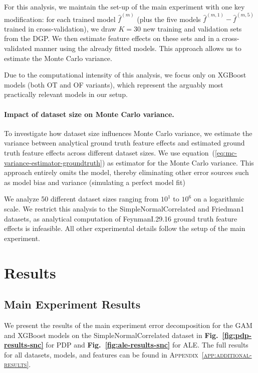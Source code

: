 \documentclass[runningheads]{llncs}
\begin{document}
For this analysis, we maintain the set-up of the main experiment with one key
modification: for each trained model $\hat f^{(m)}$ (plus the five
models $\hat f^{(m,1)} - \hat f^{(m,5)}$ trained in cross-validation), we draw $K=30$ new training
and validation sets from the DGP. We then estimate feature effects on these  %
sets and in a cross-validated manner using the already fitted models. This approach
allows us to estimate the Monte Carlo variance.

Due to the computational intensity of this analysis, we focus only on XGBoost models
(both OT and OF variants), which represent the arguably most practically relevant models
in our setup.

\paragraph{Impact of dataset size on Monte Carlo variance.}
To investigate how dataset size influences Monte Carlo variance,
we estimate the variance between analytical ground truth feature effects
and estimated ground truth feature effects across different dataset sizes.
We use equation~(\ref{eq:mc-variance-estimator-groundtruth}) as estimator
for the Monte Carlo variance. This approach entirely omits the model, thereby
eliminating other error sources such as model bias and variance (simulating a perfect model fit)

We analyze 50 different dataset sizes ranging from $10^1$ to $10^6$ on a logarithmic
scale. We restrict this analysis to the SimpleNormalCorrelated and Friedman1 datasets,
as analytical computation of FeynmanI.29.16 ground truth feature effects is infeasible.
All other experimental details follow the setup of the main experiment.

\section{Results}\label{sec:results}

\subsection{Main Experiment Results}

We present the results of the main experiment error decomposition for the GAM and
XGBoost models on the
SimpleNormalCorrelated dataset in \textbf{Fig.\@~\ref{fig:pdp-results-snc}} for
PDP and \textbf{Fig.\@~\ref{fig:ale-results-snc}} for ALE. The full results for  %
all datasets, models, and features can be found in
\textsc{Appendix~\ref{app:additional-results}}.
\end{document}

